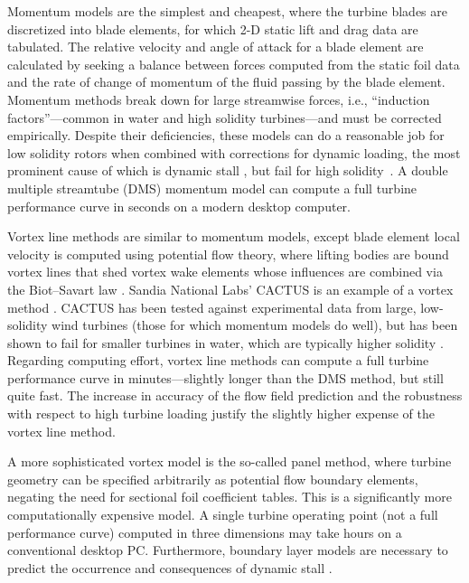 Momentum models are the simplest and cheapest, where the turbine blades are
discretized into blade elements, for which 2-D static lift and drag data are
tabulated. The relative velocity and angle of attack for a blade element are
calculated by seeking a balance between forces computed from the static foil
data and the rate of change of momentum of the fluid passing by the blade
element. Momentum methods break down for large streamwise forces, i.e.,
``induction factors''---common in water and high solidity turbines---and must be
corrected empirically. Despite their deficiencies, these models can do a
reasonable job for low solidity rotors when combined with corrections for
dynamic loading, the most prominent cause of which is dynamic stall
\cite{Para2002}, but fail for high solidity~\cite{Joo2015}. A double multiple
streamtube (DMS) momentum model can compute a full turbine performance curve in
seconds on a modern desktop computer.

Vortex line methods are similar to momentum models, except blade element local
velocity is computed using potential flow theory, where lifting bodies are bound
vortex lines that shed vortex wake elements whose influences are combined via
the Biot--Savart law \cite{Strickland1979}. Sandia National Labs' CACTUS is an
example of a vortex method \cite{Murray2011}. CACTUS has been tested against
experimental data from large, low-solidity wind turbines (those for which
momentum models do well), but has been shown to fail for smaller turbines in
water, which are typically higher solidity \cite{Michelen2014}. Regarding
computing effort, vortex line methods can compute a full turbine performance
curve in minutes---slightly longer than the DMS method, but still quite fast.
The increase in accuracy of the flow field prediction and the robustness with
respect to high turbine loading justify the slightly higher expense of the
vortex line method.

A more sophisticated vortex model is the so-called panel method, where turbine
geometry can be specified arbitrarily as potential flow boundary elements,
negating the need for sectional foil coefficient tables. This is a significantly
more computationally expensive model. A single turbine operating point (not a
full performance curve) computed in three dimensions may take hours on a
conventional desktop PC. Furthermore, boundary layer models are necessary to
predict the occurrence and consequences of dynamic stall \cite{Zanon2012}.

